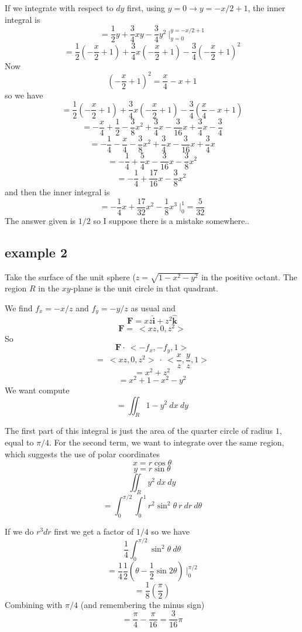 \documentclass[11pt, oneside]{article}   	%
\begin{document}
If we integrate with respect to $dy$ first, using $y = 0 \rightarrow y = -x/2 + 1$, the inner integral is
\[ = \frac{1}{2} y + \frac{3}{4}xy - \frac{3}{4} y^2 \  \bigg |_{y=0}^{y = -x/2 + 1} \]
\[ = \frac{1}{2}(-\frac{x}{2} + 1) + \frac{3}{4}x(-\frac{x}{2} + 1) -  \frac{3}{4}(-\frac{x}{2} + 1)^2 \]
Now
\[ (-\frac{x}{2} + 1)^2 = \frac{x}{4} -x + 1\]
 so we have
 \[ = \frac{1}{2}(-\frac{x}{2} + 1) + \frac{3}{4}x(-\frac{x}{2} + 1) -  \frac{3}{4}(\frac{x}{4} -x + 1) \]
\[ = -\frac{x}{4} + \frac{1}{2} - \frac{3}{8}x^2 + \frac{3}{4}x - \frac{3}{16}x + \frac{3}{4}x - \frac{3}{4} \]
\[ = - \frac{1}{4} -\frac{x}{4} - \frac{3}{8}x^2 + \frac{3}{4}x - \frac{3}{16}x + \frac{3}{4}x \]
\[ = - \frac{1}{4} +\frac{5}{4}x  - \frac{3}{16}x - \frac{3}{8}x^2  \]
\[ = - \frac{1}{4} + \frac{17}{16}x  - \frac{3}{8}x^2 \  \]
and then the inner integral is
\[ = - \frac{1}{4}x + \frac{17}{32}x^2  - \frac{1}{8}x^3 \  \bigg |_0^1 = \frac{5}{32}  \]
The answer given is $1/2$ so I suppose there is a mistake somewhere..
\subsection*{example 2}

Take the surface of the unit sphere ($z = \sqrt{1-x^2-y^2}$ in the positive octant.  The region $R$ in the $xy$-plane is the unit circle in that quadrant.

We find $f_x = -x/z$ and $f_y = -y/z$ as usual and 
\[ \mathbf{F} = xz \hat{\mathbf{i}} + z^2 \hat{\mathbf{k}} \]
\[ \mathbf{F} = \ <xz,0,z^2> \]
So 
\[ \mathbf{F} \cdot \ < -f_x,-f_y,1> \]
\[ = \ <xz,0,z^2> \ \cdot \ < \frac{x}{z},\frac{y}{z},1> \]
\[ = x^2 + z^2 \]
\[ = x^2 + 1 - x^2 - y^2 \]
We want compute
\[ = \iint_R 1 -y^2 \ dx \ dy \]

The first part of this integral is just the area of the quarter circle of radius $1$, equal to $\pi/4$.
For the second term, we want to integrate over the same region, which suggests the use of polar coordinates 
\[ x = r \cos \theta \]
\[ y = r \sin \theta \]
\[ \iint_R y^2 \ dx \ dy \]
\[ = \int_0^{\pi/2} \int_0^1 r^2 \sin^2 \theta \ r \ dr \ d \theta \]

If we do $r^3 dr$ first we get a factor of $1/4$ so we have 
\[ \frac{1}{4} \int_0^{\pi/2} \sin^2 \theta \ d \theta \]
\[ = \frac{1}{4} \frac{1}{2}(\theta - \frac{1}{2}\sin 2 \theta) \  \bigg |_0^{\pi/2}  \]
\[ = \frac{1}{8} (\frac{\pi}{2}) \]
Combining with $\pi/4$ (and remembering the minus sign)
\[ = \frac{\pi}{4} - \frac{\pi}{16} = \frac{3}{16} \pi \]
\end{document}
